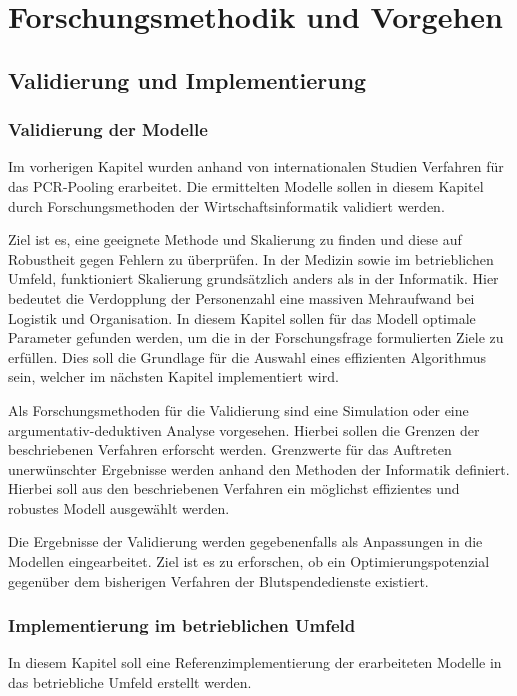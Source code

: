 
\chapter{Forschungsmethodik und Vorgehen}
\section{Validierung und Implementierung}
\subsection{Validierung der Modelle}
Im vorherigen Kapitel wurden anhand von internationalen Studien Verfahren für das PCR-Pooling erarbeitet.
Die ermittelten Modelle sollen in diesem Kapitel durch Forschungsmethoden der Wirtschaftsinformatik validiert werden.

Ziel ist es, eine geeignete Methode und Skalierung zu finden und diese auf Robustheit gegen Fehlern zu überprüfen.
In der Medizin sowie im betrieblichen Umfeld, funktioniert Skalierung grundsätzlich anders als in der Informatik.
Hier bedeutet die Verdopplung der Personenzahl eine massiven Mehraufwand bei Logistik und Organisation.
In diesem Kapitel sollen für das Modell optimale Parameter gefunden werden, um die in der Forschungsfrage formulierten Ziele zu erfüllen.
Dies soll die Grundlage für die Auswahl eines effizienten Algorithmus sein, welcher im nächsten Kapitel implementiert wird.

Als Forschungsmethoden für die Validierung sind eine Simulation oder eine argumentativ-deduktiven Analyse vorgesehen.
Hierbei sollen die Grenzen der beschriebenen Verfahren erforscht werden.
Grenzwerte für das Auftreten unerwünschter Ergebnisse werden anhand den Methoden der Informatik definiert.
Hierbei soll aus den beschriebenen Verfahren ein möglichst effizientes und robustes Modell ausgewählt werden.

Die Ergebnisse der Validierung werden gegebenenfalls als Anpassungen in die Modellen eingearbeitet.
Ziel ist es zu erforschen, ob ein Optimierungspotenzial gegenüber dem bisherigen Verfahren der Blutspendedienste existiert.

\subsection{Implementierung im betrieblichen Umfeld}
In diesem Kapitel soll eine Referenzimplementierung der erarbeiteten Modelle in das betriebliche Umfeld erstellt werden.

